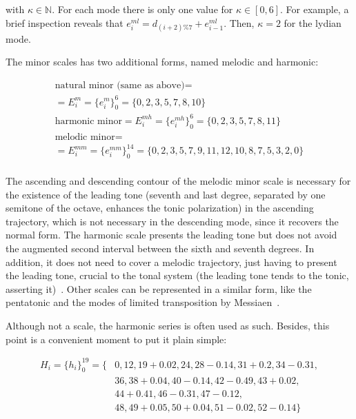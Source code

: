 \documentclass[
 aip,
 jmp,
 amsmath,amssymb,
 reprint,
]{revtex4-1}
\begin{document}
\noindent with $\kappa \in \mathbb{N}$. For each mode there is only one value
for $\kappa \in [0,6]$. For example, a brief inspection reveals that
$e_i^{ml}=d_{(i+2)\%7}+e_{i-1}^{ml}$. Then, $\kappa=2$ for the lydian mode.

The minor scales has two additional forms, named melodic and harmonic:

\begin{multline}\label{eq:escalasMenores}
\text{natural minor (same as above)}  = \\ = E_i^m = \{e_i^m\}_0^6 = \{0,2,3,5,7,8,10\} \\
\text{harmonic minor}  = E_i^{mh} = \{e_i^{mh}\}_0^6 = \{0,2,3,5,7,8,11\} \\
\text{melodic minor}  = \\ = E_i^{mm} = \{e_i^{mm}\}_0^{14} = \{0,2,3,5,7,9,11,12,10,8,7,5,3,2,0\} \\
\end{multline}

The ascending and descending contour of the melodic minor scale is necessary for the existence of the leading tone (seventh and last degree, separated by one semitone of the octave, enhances the tonic polarization) in the ascending trajectory, which is not necessary in the descending mode, since it recovers the normal form. The harmonic scale presents the leading tone but does not avoid the augmented second interval between the sixth and seventh degrees. In addition, it does not need to cover a melodic trajectory, just having to present the leading tone, crucial to the tonal system (the leading tone tends to the tonic, asserting it)~\cite{Harmonia}. 
Other scales can be represented in a similar form, like the pentatonic and the
modes of limited transposition by Messiaen~\cite{Messiaen}. 

Although not a scale, the harmonic series is often used as such. Besides, this point is a convenient moment to put it plain simple:

\begin{equation}\label{eq:serieHarmonica}
\begin{split}
H_i = \{h_i\}_0^{19}=\{ & 0,12,19+0.02,  24,28-0.14, 31+0.2, 34-0.31, \\
                     & 36, 38+0.04,40-0.14, 42-0.49, 43+0.02, \\
                     & 44+0.41, 46-0.31, 47-0.12, \\
                     & 48, 49+0.05, 50+0.04, 51-0.02, 52-0.14   \}
\end{split}
\end{equation}
\end{document}
